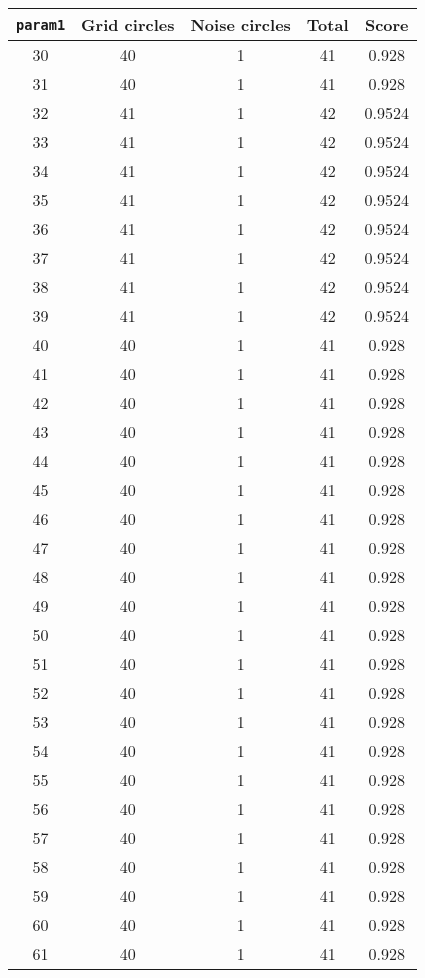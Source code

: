 \documentclass[letterpaper, 12pt]{article}
\begin{document}
\begin{longtable}{|c|c|c|c|c|}
\hline
\textbf{\texttt{param1}} & \textbf{Grid circles} & \textbf{Noise circles} & \textbf{Total} & \textbf{Score} \\
\hline
30 & 40 & 1 & 41 & 0.928 \\
\hline
31 & 40 & 1 & 41 & 0.928 \\
\hline
32 & 41 & 1 & 42 & 0.9524 \\
\hline
33 & 41 & 1 & 42 & 0.9524 \\
\hline
34 & 41 & 1 & 42 & 0.9524 \\
\hline
35 & 41 & 1 & 42 & 0.9524 \\
\hline
36 & 41 & 1 & 42 & 0.9524 \\
\hline
37 & 41 & 1 & 42 & 0.9524 \\
\hline
38 & 41 & 1 & 42 & 0.9524 \\
\hline
39 & 41 & 1 & 42 & 0.9524 \\
\hline
40 & 40 & 1 & 41 & 0.928 \\
\hline
41 & 40 & 1 & 41 & 0.928 \\
\hline
42 & 40 & 1 & 41 & 0.928 \\
\hline
43 & 40 & 1 & 41 & 0.928 \\
\hline
44 & 40 & 1 & 41 & 0.928 \\
\hline
45 & 40 & 1 & 41 & 0.928 \\
\hline
46 & 40 & 1 & 41 & 0.928 \\
\hline
47 & 40 & 1 & 41 & 0.928 \\
\hline
48 & 40 & 1 & 41 & 0.928 \\
\hline
49 & 40 & 1 & 41 & 0.928 \\
\hline
50 & 40 & 1 & 41 & 0.928 \\
\hline
51 & 40 & 1 & 41 & 0.928 \\
\hline
52 & 40 & 1 & 41 & 0.928 \\
\hline
53 & 40 & 1 & 41 & 0.928 \\
\hline
54 & 40 & 1 & 41 & 0.928 \\
\hline
55 & 40 & 1 & 41 & 0.928 \\
\hline
56 & 40 & 1 & 41 & 0.928 \\
\hline
57 & 40 & 1 & 41 & 0.928 \\
\hline
58 & 40 & 1 & 41 & 0.928 \\
\hline
59 & 40 & 1 & 41 & 0.928 \\
\hline
60 & 40 & 1 & 41 & 0.928 \\
\hline
61 & 40 & 1 & 41 & 0.928 \\

\end{longtable}
\end{document}
